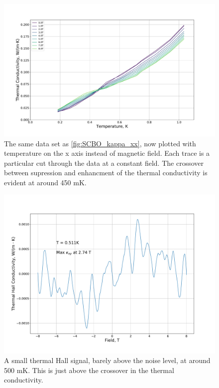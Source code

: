 \documentclass{thesis-umich}
\begin{document}
\begin{figure}
	\caption[Temperature Dependence of SCBO Thermal Conductivity]{The same data set as \ref{fig:SCBO_kappa_xx}, now plotted with temperature on the x axis instead of magnetic field. Each trace is a particular cut through the data at a constant field. The crossover between supression and enhancment of the thermal conductivity is evident at around 450 mK.}
	\includegraphics[width=\columnwidth]{figures/SCBO_kappa_vs_T.pdf}
\end{figure}

\begin{figure}
	\caption[Small thermal Hall signal]{A small thermal Hall signal, barely above the noise level, at around 500 mK. This is just above the crossover in the thermal conductivity.}
	\includegraphics[width=\columnwidth]{figures/SCBO_kappa_xy_vs_B}
\end{figure}
\end{document}
